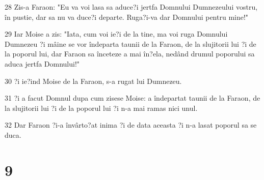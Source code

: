 \par 28 Zis-a Faraon: "Eu va voi lasa sa aduce?i jertfa Domnului Dumnezeului vostru, în pustie, dar sa nu va duce?i departe. Ruga?i-va dar Domnului pentru mine!"
\par 29 Iar Moise a zis: "Iata, cum voi ie?i de la tine, ma voi ruga Domnului Dumnezeu ?i mâine se vor îndeparta taunii de la Faraon, de la slujitorii lui ?i de la poporul lui, dar Faraon sa înceteze a mai în?ela, nedând drumul poporului sa aduca jertfa Domnului!"
\par 30 ?i ie?ind Moise de la Faraon, s-a rugat lui Dumnezeu.
\par 31 ?i a facut Domnul dupa cum zisese Moise: a îndepartat taunii de la Faraon, de la slujitorii lui ?i de la poporul lui ?i n-a mai ramas nici unul.
\par 32 Dar Faraon ?i-a învârto?at inima ?i de data aceasta ?i n-a lasat poporul sa se duca.

\chapter{9}


